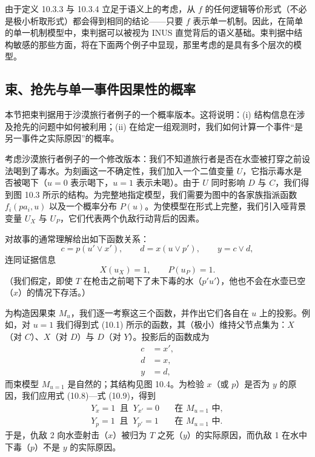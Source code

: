 由于定义 10.3.3 与 10.3.4 立足于语义上的考虑，从 $f$ 的任何逻辑等价形式（不必是极小析取形式）都会得到相同的结论——只要 $f$ 表示单一机制。因此，在简单的单一机制模型中，束判据可以被视为 INUS 直觉背后的语义基础。束判据中结构敏感的那些方面，将在下面两个例子中显现，那里考虑的是具有多个层次的模型。

\subsection{束、抢先与单一事件因果性的概率}

本节把束判据用于沙漠旅行者例子的一个概率版本。这将说明：(i) 结构信息在涉及抢先的问题中如何被利用；(ii) 在给定一组观测时，我们如何计算一个事件“是另一事件之实际原因”的概率。

考虑沙漠旅行者例子的一个修改版本：我们不知道旅行者是否在水壶被打穿之前设法喝到了毒水。为刻画这一不确定性，我们加入一个二值变量 $U$，它指示毒水是否被喝下（$u=0$ 表示喝下，$u=1$ 表示未喝）。由于 $U$ 同时影响 $D$ 与 $C$，我们得到图 10.3 所示的结构。为完整地指定模型，我们需要为图中的各家族指派函数 $f_i(pa_i,u)$ 以及一个概率分布 $P(u)$。为使模型在形式上完整，我们引入哑背景变量 $U_X$ 与 $U_P$，它们代表两个仇敌行动背后的因素。

对故事的通常理解给出如下函数关系：
\[
c=p(u'\vee x'),\qquad d=x(u\vee p'),\qquad y=c\vee d,
\]
连同证据信息
\[
X(u_X)=1,\qquad P(u_P)=1.
\]
（我们假定，即使 $T$ 在枪击之前喝下了未下毒的水（$p'u'$），他也不会在水壶已空（$x$）的情况下存活。）

为构造因果束 $M_u$，我们逐一考察这三个函数，并作出它们各自在 $u$ 上的投影。例如，对 $u=1$ 我们得到式 \textup{(10.1)} 所示的函数，其（极小）维持父节点集为：$X$（对 $C$）、$X$（对 $D$）与 $D$（对 $Y$）。投影后的函数成为
\begin{equation}
\begin{aligned}
c&=x',\\
d&=x,\\
y&=d,
\end{aligned}\tag{10.14}
\end{equation}
而束模型 $M_{u=1}$ 是自然的；其结构见图 10.4。为检验 $x$（或 $p$）是否为 $y$ 的原因，我们应用式 \textup{(10.8)}—式 \textup{(10.9)}，得到
\begin{equation}
\begin{aligned}
Y_x=1\ \text{ 且 }\ Y_{x'}=0&\quad\text{在 } M_{u=1} \text{ 中},\\
Y_p=1\ \text{ 且 }\ Y_{p'}=1&\quad\text{在 } M_{u=1} \text{ 中}.
\end{aligned}\tag{10.15}
\end{equation}
于是，仇敌 2 向水壶射击（$x$）被归为 $T$ 之死（$y$）的实际原因，而仇敌 1 在水中下毒（$p$）不是 $y$ 的实际原因。

